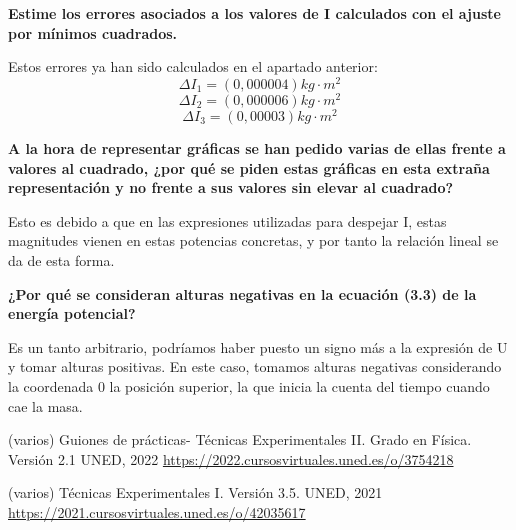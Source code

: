 \documentclass[a4paper,12pt,spanish]{article}
\begin{document}
	\vspace{\baselineskip}
	
	\textbf{Estime los errores asociados a los valores de I calculados con el ajuste por mínimos cuadrados.}

	Estos errores ya han sido calculados en el apartado anterior:
	\[ \Delta I_1 = (0,000004) \si{kg\cdot m^2}
	\] %
	\[ \Delta I_2 = (0,000006) \si{kg\cdot m^2}
	\]
	\[ \Delta I_3 = (0,00003) \si{kg\cdot m^2}
	\]
	
	\vspace{\baselineskip}
	
	\textbf{A la hora de representar gráficas se han pedido varias de ellas frente
		a valores al cuadrado, ¿por qué se piden estas gráficas en esta extraña
		representación y no frente a sus valores sin elevar al cuadrado?}
	
	Esto es debido a que en las expresiones utilizadas para despejar I, estas magnitudes vienen en estas potencias concretas, y por tanto la relación lineal se da de esta forma.
	
	\vspace{\baselineskip}
	
	\textbf{¿Por qué se consideran alturas negativas en la ecuación (3.3) de la
		energía potencial?}
	
	Es un tanto arbitrario, podríamos haber puesto un signo más a la expresión de U y tomar alturas positivas. En este caso, tomamos alturas negativas considerando la coordenada 0 la posición superior, la que inicia la cuenta del tiempo cuando cae la masa.
	

	
	
	\begin{thebibliography}{3}
		
		
		 (varios) Guiones de prácticas- Técnicas Experimentales II. Grado en Física. Versión 2.1  UNED, 2022 \url{https://2022.cursosvirtuales.uned.es/o/3754218}
		
		
		 (varios) Técnicas Experimentales I. Versión 3.5.  UNED, 2021 \url{https://2021.cursosvirtuales.uned.es/o/42035617}
		
		
		
		
		
	\end{thebibliography}
	
	
	
	
	
	
\end{document}
